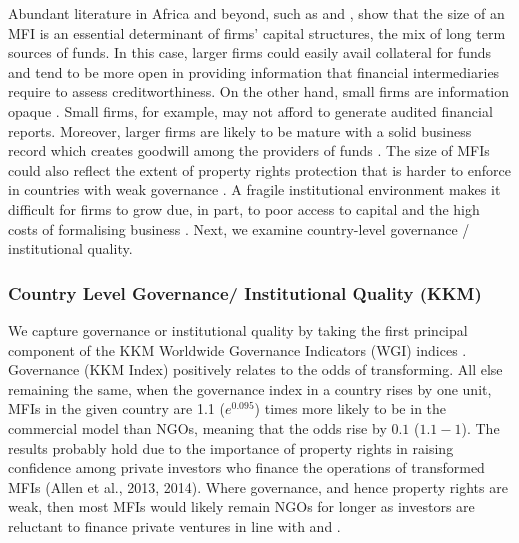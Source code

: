 \documentclass[a4paper, nobind]{templates/ociamthesis}
\begin{document}
Abundant literature in Africa and beyond, such as \textcite{gwatidzo2009corporate} and \textcite{kodongo2015capital}, show that the size of an MFI is an essential determinant of firms' capital structures, the mix of long term sources of funds. In this case, larger firms could easily avail collateral for funds and tend to be more open in providing information that financial intermediaries require to assess creditworthiness. On the other hand, small firms are information opaque \autocite{beck2014sme,kersten2017small}. Small firms, for example, may not afford to generate audited financial reports. Moreover, larger firms are likely to be mature with a solid business record which creates goodwill among the providers of funds \autocite{beck2008finance}. The size of MFIs could also reflect the extent of property rights protection that is harder to enforce in countries with weak governance \autocite{johnson2002property,claessens2003financial}. A fragile institutional environment makes it difficult for firms to grow due, in part, to poor access to capital and the high costs of formalising business \autocite{hansen2004reconsidering}. Next, we examine country-level governance / institutional quality.

\hypertarget{country-level-governance-institutional-quality-kkm}{%
\subsubsection{Country Level Governance/ Institutional Quality (KKM)}\label{country-level-governance-institutional-quality-kkm}}

We capture governance or institutional quality by taking the first principal component of the KKM Worldwide Governance Indicators (WGI) indices \autocite{kraay2010worldwide}. Governance (KKM Index) positively relates to the odds of transforming. All else remaining the same, when the governance index in a country rises by one unit, MFIs in the given country are 1.1 (\(e^{0.095}\)) times more likely to be in the commercial model than NGOs, meaning that the odds rise by \(0.1\) (\(1.1 - 1\)). The results probably hold due to the importance of property rights in raising confidence among private investors who finance the operations of transformed MFIs (Allen et al., 2013, 2014). Where governance, and hence property rights are weak, then most MFIs would likely remain NGOs for longer as investors are reluctant to finance private ventures in line with \textcite{johnson2002property} and \textcite{claessens2003financial}.
\end{document}
